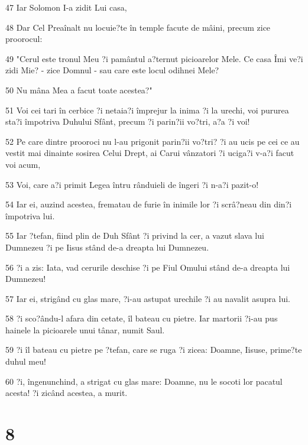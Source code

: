 \par 47 Iar Solomon I-a zidit Lui casa,
\par 48 Dar Cel Preaînalt nu locuie?te în temple facute de mâini, precum zice proorocul:
\par 49 "Cerul este tronul Meu ?i pamântul a?ternut picioarelor Mele. Ce casa Îmi ve?i zidi Mie? - zice Domnul - sau care este locul odihnei Mele?
\par 50 Nu mâna Mea a facut toate acestea?"
\par 51 Voi cei tari în cerbice ?i netaia?i împrejur la inima ?i la urechi, voi pururea sta?i împotriva Duhului Sfânt, precum ?i parin?ii vo?tri, a?a ?i voi!
\par 52 Pe care dintre prooroci nu l-au prigonit parin?ii vo?tri? ?i au ucis pe cei ce au vestit mai dinainte sosirea Celui Drept, ai Carui vânzatori ?i uciga?i v-a?i facut voi acum,
\par 53 Voi, care a?i primit Legea întru rânduieli de îngeri ?i n-a?i pazit-o!
\par 54 Iar ei, auzind acestea, frematau de furie în inimile lor ?i scrâ?neau din din?i împotriva lui.
\par 55 Iar ?tefan, fiind plin de Duh Sfânt ?i privind la cer, a vazut slava lui Dumnezeu ?i pe Iisus stând de-a dreapta lui Dumnezeu.
\par 56 ?i a zis: Iata, vad cerurile deschise ?i pe Fiul Omului stând de-a dreapta lui Dumnezeu!
\par 57 Iar ei, strigând cu glas mare, ?i-au astupat urechile ?i au navalit asupra lui.
\par 58 ?i sco?ându-l afara din cetate, îl bateau cu pietre. Iar martorii ?i-au pus hainele la picioarele unui tânar, numit Saul.
\par 59 ?i îl bateau cu pietre pe ?tefan, care se ruga ?i zicea: Doamne, Iisuse, prime?te duhul meu!
\par 60 ?i, îngenunchind, a strigat cu glas mare: Doamne, nu le socoti lor pacatul acesta! ?i zicând acestea, a murit.

\chapter{8}

